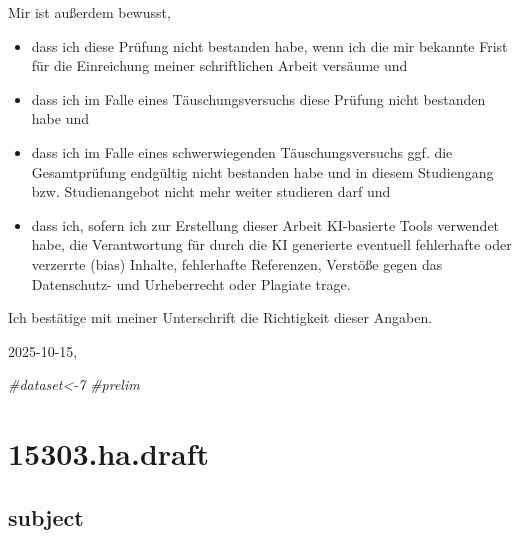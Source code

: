 \documentclass[
  12pt,
  oneside]{book}
\newenvironment{Shaded}{\begin{snugshade}}{\end{snugshade}}
\newcommand{\CommentTok}[1]{\textcolor[rgb]{0.56,0.35,0.01}{\textit{#1}}}
\providecommand{\tightlist}{%
  \setlength{\itemsep}{0pt}\setlength{\parskip}{0pt}}
\begin{document}
Mir ist außerdem bewusst,

\begin{itemize}
\tightlist
\item
  dass ich diese Prüfung nicht bestanden habe, wenn ich die mir bekannte Frist für die Einreichung meiner schriftlichen Arbeit versäume und
\item
  dass ich im Falle eines Täuschungsversuchs diese Prüfung nicht bestanden habe und
\item
  dass ich im Falle eines schwerwiegenden Täuschungsversuchs ggf. die Gesamtprüfung endgültig nicht bestanden habe und in diesem Studiengang bzw. Studienangebot nicht mehr weiter studieren darf und
\item
  dass ich, sofern ich zur Erstellung dieser Arbeit KI-basierte Tools verwendet habe, die Verantwortung für durch die KI generierte eventuell fehlerhafte oder verzerrte (bias) Inhalte, fehlerhafte Referenzen, Verstöße gegen das Datenschutz- und Urheberrecht oder Plagiate trage.
\end{itemize}

Ich bestätige mit meiner Unterschrift die Richtigkeit dieser Angaben.

2025-10-15,

\begin{Shaded}
\begin{Highlighting}[]
\CommentTok{\#dataset\textless{}{-}7}
\CommentTok{\#prelim}
\end{Highlighting}
\end{Shaded}

\chapter{15303.ha.draft}\label{ha.draft}

\section{subject}\label{subject}
\end{document}
